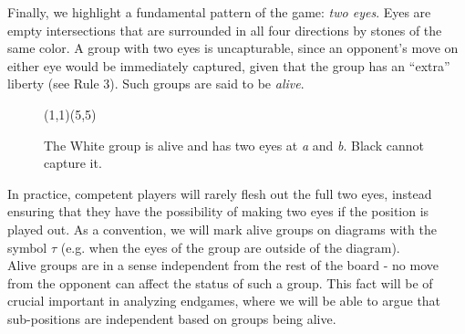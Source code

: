 \documentclass[../math194_paper.tex]{subfiles}
\begin{document}
Finally, we highlight a fundamental pattern of the game: \textit{two eyes}. 
Eyes are empty intersections that are surrounded in all
four directions by stones of the same color. A group with two eyes is uncapturable, 
since an opponent's move on either eye would be immediately captured, given that the group
has an ``extra'' liberty (see Rule 3). Such groups are said to be \textit{alive}. 

\begin{figure}[H]
\centering
\begin{psgopartialboard*}{(1,1)(5,5)}
\end{psgopartialboard*}
    \caption*{The White group is alive and  has two eyes at \textit{a} and \textit{b}. 
    Black cannot capture it.}
\end{figure}

In practice, competent players will rarely flesh out the full two eyes, instead
ensuring that they have the possibility of making two eyes if the position is played out. 
As a convention, we will mark alive groups on diagrams with the symbol $\tau$ (e.g. when 
the eyes of the group are outside of the diagram). \\

Alive groups are in a sense independent from the rest of the board - no move from the 
opponent can affect the status of such a group. This fact will be of crucial important 
in analyzing endgames, where we will be able to argue that sub-positions are independent 
based on groups being alive.
\end{document}

